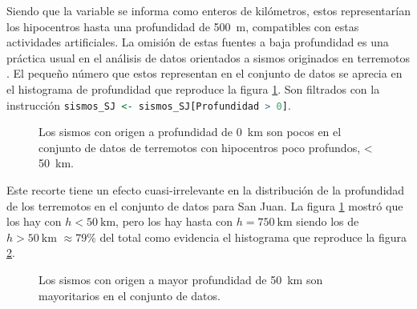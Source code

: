 \documentclass[a4paper]{report}
\begin{document}
Siendo que la variable se informa como enteros de kilómetros, estos representarían los hipocentros hasta una profundidad de \SI{500}{\metre}, compatibles con estas actividades artificiales.
La omisión de estas fuentes a baja profundidad es una práctica usual en el análisis de datos orientados a sismos originados en terremotos \cite{hu_applying_2024}.
El pequeño número que estos representan  en el conjunto de datos se aprecia en el histograma de profundidad que reproduce la figura \ref{fig:histograma_profundidad50km}.
Son filtrados con la instrucción \lstinline[language = R]'sismos_SJ <- sismos_SJ[Profundidad > 0]'.
\begin{figure}[!ht]
	\centering
  \vspace{-1.5cm} %
	
  \vspace{-1cm} %
	\caption{Los sismos con origen a profundidad de \SI{0}{\kilo\metre} son pocos en el conjunto de datos de terremotos con hipocentros poco profundos, < \SI{50}{\kilo\metre}.}
	\label{fig:histograma_profundidad50km}
\end{figure}

Este recorte tiene un efecto cuasi-irrelevante en la distribución de la profundidad de los terremotos en el conjunto de datos para San Juan. 
La figura \ref{fig:histograma_profundidad50km} mostró que los hay con \(h < \SI{50}{\kilo\metre}\), pero los hay hasta con \(h= \SI{750}{\kilo\metre}\) siendo los de \(h > \SI{50}{\kilo\metre}\) \(\approx 79\%\) del total como evidencia el histograma que reproduce la figura \ref{fig:histograma_profundidad750km}.

\begin{figure}[!ht]
	\centering
  \vspace{-1.5cm} %
	
  \vspace{-1cm} %
	\caption{Los sismos con origen a mayor profundidad de \SI{50}{\kilo\metre} son mayoritarios en el conjunto de datos.}
	\label{fig:histograma_profundidad750km}
\end{figure}
\end{document}
